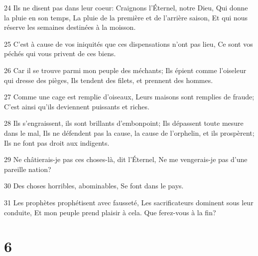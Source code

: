 \par 24 Ils ne disent pas dans leur coeur: Craignons l'Éternel, notre Dieu, Qui donne la pluie en son temps, La pluie de la première et de l'arrière saison, Et qui nous réserve les semaines destinées à la moisson.
\par 25 C'est à cause de vos iniquités que ces dispensations n'ont pas lieu, Ce sont vos péchés qui vous privent de ces biens.
\par 26 Car il se trouve parmi mon peuple des méchants; Ils épient comme l'oiseleur qui dresse des pièges, Ils tendent des filets, et prennent des hommes.
\par 27 Comme une cage est remplie d'oiseaux, Leurs maisons sont remplies de fraude; C'est ainsi qu'ils deviennent puissants et riches.
\par 28 Ils s'engraissent, ils sont brillants d'embonpoint; Ils dépassent toute mesure dans le mal, Ils ne défendent pas la cause, la cause de l'orphelin, et ils prospèrent; Ils ne font pas droit aux indigents.
\par 29 Ne châtierais-je pas ces choses-là, dit l'Éternel, Ne me vengerais-je pas d'une pareille nation?
\par 30 Des choses horribles, abominables, Se font dans le pays.
\par 31 Les prophètes prophétisent avec fausseté, Les sacrificateurs dominent sous leur conduite, Et mon peuple prend plaisir à cela. Que ferez-vous à la fin?

\chapter{6}

